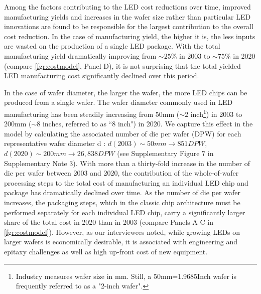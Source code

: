 \documentclass[parskip=full]{article}
\begin{document}
Among the factors contributing to the LED cost reductions over time, improved manufacturing yields and increases in the wafer size rather than particular LED innovations are found to be responsible for the largest contribution to the overall cost reduction. In the case of manufacturing yield, the higher it is, the less inputs are wasted on the production of a single LED package. With the total manufacturing yield dramatically improving from $\sim25\%$ in 2003 to $\sim75\%$ in 2020 (compare \cref{fgr:costmodel}, Panel D), it is not surprising that the total yielded LED manufacturing cost significantly declined over this period.

In the case of wafer diameter, the larger the wafer, the more LED chips can be produced from a single wafer. The wafer diameter commonly used in LED manufacturing has been steadily increasing from 50mm ($\sim2$ inch\footnote{Industry measures wafer size in mm. Still, a 50mm=1.9685Inch wafer is frequently referred to as a "2-inch wafer".}) in 2003 to 200mm ($\sim$8 inches, referred to as “8 inch") in 2020. We capture this effect in the model by calculating the associated number of die per wafer (DPW) for each representative wafer diameter d \cite{de2005investigation}: $d(2003)\sim 50 mm \rightarrow851 DPW$, $d(2020)\sim200 mm \rightarrow 26,838 DPW$ (see Supplementary Figure 7 in Supplementary Note 3). With more than a thirty-fold increase in the number of die per wafer between 2003 and 2020, the contribution of the whole-of-wafer processing steps to the total cost of manufacturing an individual LED chip and package has dramatically declined over time. As the number of die per wafer increases, the packaging steps, which in the classic chip architecture must be performed separately for each individual LED chip, carry a significantly larger share of the total cost in 2020 than in 2003 (compare Panels A-C in \cref{fgr:costmodel}). However, as our interviewees noted, while growing LEDs on larger wafers is economically desirable, it is associated with engineering and epitaxy challenges as well as high up-front cost of new equipment.
\end{document}
